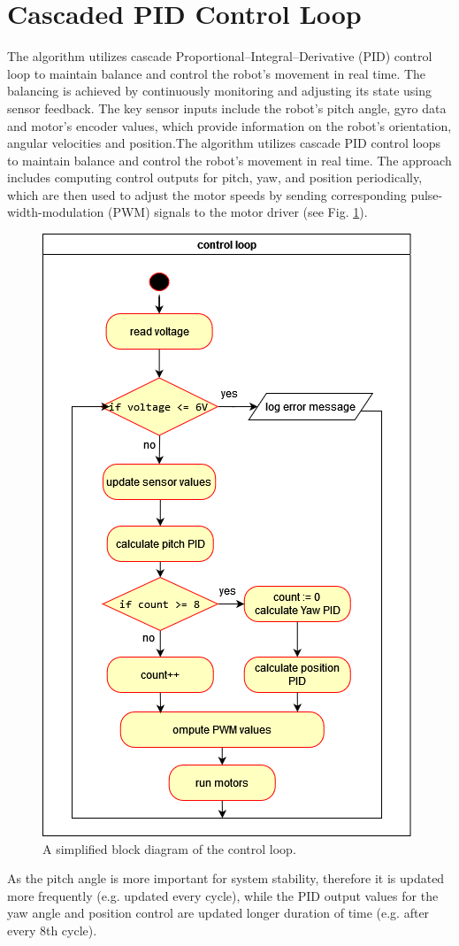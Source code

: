 
\section{Cascaded PID Control Loop}

The algorithm utilizes cascade Proportional–Integral–Derivative (PID) control loop to maintain balance and control the robot's movement in real time. The balancing is achieved by continuously monitoring and adjusting its state using sensor feedback. The key sensor inputs include the robot's pitch angle, gyro data and motor's encoder values, which provide information on the robot's orientation, angular velocities and position.The algorithm utilizes cascade PID control loops to maintain balance and control the robot's movement in real time. The approach includes computing control outputs for pitch, yaw, and position periodically, which are then used to adjust the motor speeds by sending corresponding pulse-width-modulation (PWM) signals to the motor driver (see Fig. \ref{fig:control-loop}).

\begin{figure}[h]
	\centering
	\includegraphics[width=0.5\linewidth]{assets/Control_Loop.png}
	\caption{A simplified block diagram of the control loop. }
	\label{fig:control-loop}
\end{figure}

As the pitch angle is more important for system stability, therefore it is updated more frequently (e.g. updated every cycle), while the PID output values for the yaw angle and position control are updated longer duration of time (e.g. after every 8th cycle).

